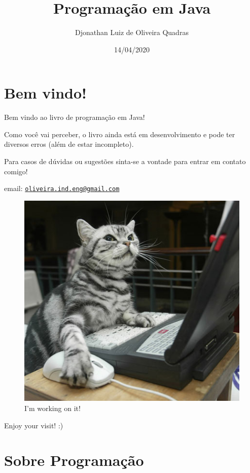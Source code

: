 \documentclass[
]{book}
\title{Programação em Java}
\author{Djonathan Luiz de Oliveira Quadras}
\date{14/04/2020}
\begin{document}
\maketitle

{
\setcounter{tocdepth}{1}
\tableofcontents
}
\hypertarget{bem-vindo}{%
\chapter*{Bem vindo!}\label{bem-vindo}}

Bem vindo ao livro de programação em Java!

Como você vai perceber, o livro ainda está em desenvolvimento e pode ter diversos erros (além de estar incompleto).

Para casos de dúvidas ou sugestões sinta-se a vontade para entrar em contato comigo!

email: \href{mailto:oliveira.ind.eng@gmail.com}{\nolinkurl{oliveira.ind.eng@gmail.com}}

\begin{figure}
\centering
\includegraphics{imagens/cat.jpg}
\caption{I'm working on it!}
\end{figure}

Enjoy your visit! :)

\hypertarget{sobre-programauxe7uxe3o}{%
\chapter*{Sobre Programação}\label{sobre-programauxe7uxe3o}}
\end{document}
